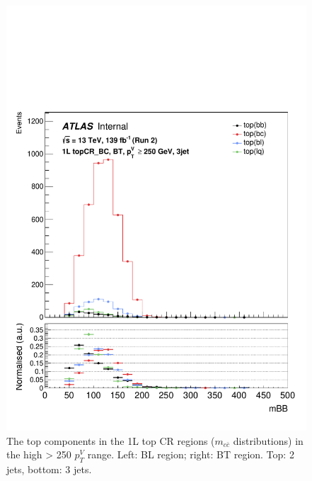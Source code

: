 \begin{figure}[h!]
\includegraphics[scale=0.253]{Images/VH/top/OneLepton_top_1bttag3jet_topCR_BC_250ptv_mBB.pdf}
\caption{The top components in the 1L top CR regions ($m_{c\bar{c}}$ distributions) in the high  > 250 $p_T^V$ range. Left: BL region; right: BT region. Top: 2 jets, bottom: 3 jets.} 
\label{fig:toptopCRshighptv}
\end{figure}
